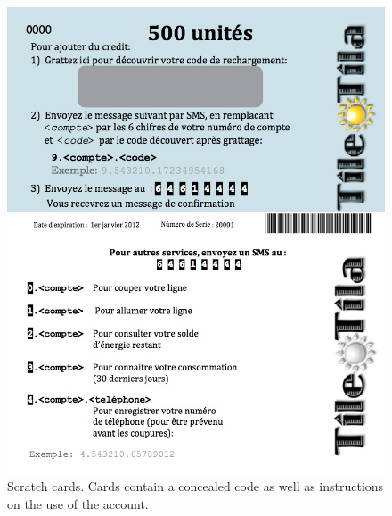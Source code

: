 \documentclass{sig-alternate}
\begin{document}
\begin{figure}[]
\begin{center}
\includegraphics[width=\columnwidth]{figures/scratchCards.jpg}
\end{center}
\caption{Scratch cards.  Cards contain a concealed code as well as instructions on the
use of the account.}
\label{scratchCards}
\end{figure}






\end{document}
